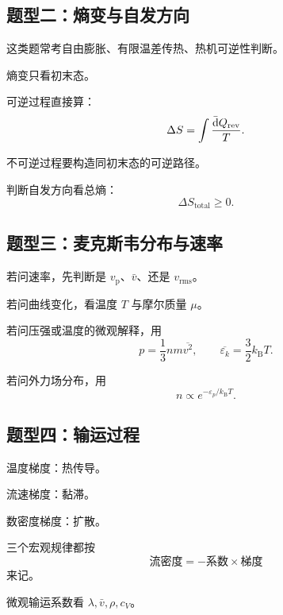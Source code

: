 \subsection{题型二：熵变与自发方向}

\begin{MethodBox}[核心路线]
这类题常考自由膨胀、有限温差传热、热机可逆性判断。
\begin{ReviewList}
  \item 熵变只看初末态。
  \item 可逆过程直接算：
  \[
    \Delta S=\int\frac{\mathop{}\!\bar{\mathrm{d}} Q_{\mathrm{rev}}}{T}.
  \]
  \item 不可逆过程要构造同初末态的可逆路径。
  \item 判断自发方向看总熵：
  \[
    \Delta S_{\mathrm{total}}\ge0.
  \]
\end{ReviewList}
\end{MethodBox}

\subsection{题型三：麦克斯韦分布与速率}

\begin{MethodBox}[核心路线]
\begin{ReviewList}
  \item 若问速率，先判断是 \(v_{\mathrm p}\)、\(\bar v\)、还是 \(v_{\mathrm{rms}}\)。
  \item 若问曲线变化，看温度 \(T\) 与摩尔质量 \(\mu\)。
  \item 若问压强或温度的微观解释，用
  \[
    p=\frac13nm\overline{v^2},
    \qquad
    \overline{\varepsilon_k}=\frac32k_{\mathrm B}T.
  \]
  \item 若问外力场分布，用
  \[
    n\propto e^{-\varepsilon_p/k_{\mathrm B}T}.
  \]
\end{ReviewList}
\end{MethodBox}

\subsection{题型四：输运过程}

\begin{MethodBox}[核心路线]
\begin{ReviewList}
  \item 温度梯度：热传导。
  \item 流速梯度：黏滞。
  \item 数密度梯度：扩散。
  \item 三个宏观规律都按
  \[
    \text{流密度}=-\text{系数}\times\text{梯度}
  \]
  来记。
  \item 微观输运系数看 \(\lambda,\bar v,\rho,c_V\)。
\end{ReviewList}
\end{MethodBox}

